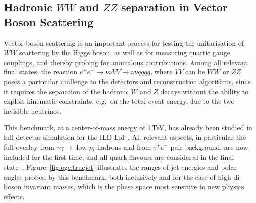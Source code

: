\subsection{Hadronic \texorpdfstring{$WW$ and $ZZ$}{WW and ZZ} separation in Vector Boson Scattering} 

Vector boson scattering is an important process for testing the unitarisation of $WW$ scattering by the Higgs boson, as well as for measuring quartic gauge couplings, and thereby probing for anomalous contributions. Among all relevant final states, the reaction $e^+e^- \to \nu\nu VV \to \nu\nu qqqq$, where $VV$ can be $WW$ or $ZZ$, poses a particular challenge to the detectors and reconstruction algorithms, since it requires the separation of the hadronic $W$ and $Z$ decays without the ability to exploit kinematic constraints, e.g.\ on the
total event energy, due to the two invisible neutrinos.

This benchmark, at a center-of-mass energy of 1\,TeV, has already been studied in full detector simulation for the ILD LoI~\cite{ild:bib:ILDloi}. All relevant aspects, in particular the full overlay from $\gamma\gamma \to$ low-$p_t$ hadrons and from $e^+e^-$ pair background, are now included for the first time, and all quark flavours are considered in the final state~\cite{ILDNote:QGCs}. Figure~\ref{fig:qgc:truejet} illustrates the ranges of jet energies and polar angles probed by this benchmark, both inclusively and for the case of high di-boson invariant
masses, which is the phase space most sensitive to new physics effects. 

